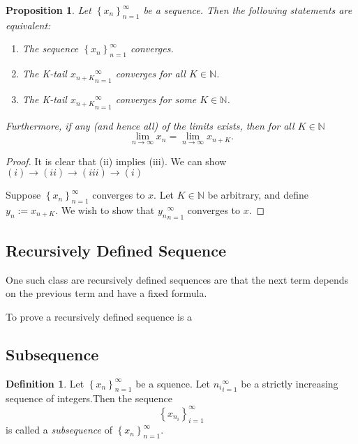 \documentclass{article}
\newtheorem{prop}[theorem]{Proposition}
\theoremstyle{definition}
\newtheorem{defi}{Definition}[section]
\begin{document}
\begin{prop}
Let $\left\{x_{n}\right\}_{n=1}^{\infty}$ be a sequence. Then the following statements are equivalent:
\begin{enumerate}[label=(i)]
    \item The sequence $\left\{x_{n}\right\}_{n=1}^{\infty}$ converges.
    \item The K-tail ${x_{n+K}}_{n=1}^{\infty}$ converges for all $K\in \mathbb{N}$.
    \item The K-tail ${x_{n+K}}_{n=1}^{\infty}$ converges for some $K\in \mathbb{N}$.
\end{enumerate}

Furthermore, if any (and hence all) of the limits exists, then for all $K\in \mathbb{N}$
$$\lim_{n\to \infty}x_{n}=\lim_{n\to \infty}x_{n+K}.$$

\end{prop}

\begin{proof}
It is clear that (ii) implies (iii). We can show $(i)\to (ii)\to (iii)\to (i)$

Suppose $\left\{x_{n}\right\}_{n=1}^{\infty}$ converges to $x$. Let $K\in \mathbb{N}$ be arbitrary, and define $y_{n}:=x_{n+K}$. We wish to show that ${y_{n}}_{n=1}^{\infty}$ converges to $x$.
\end{proof}

\subsection{Recursively Defined Sequence}

One such class are recursively defined sequences are that the next term depends on the previous term and have a fixed formula.

To prove a recursively defined sequence is a 



\subsection{Subsequence}

\begin{defi}
    Let $\left\{x_{n}\right\}_{n=1}^{\infty}$ be a squence. Let ${n_{i}}_{i=1}^{\infty}$ be a strictly increasing sequence of integers.Then the sequence 
    $$\left\{x_{n_{i}}\right\}_{i=1}^{\infty}$$ is called a \textit{subsequence} of $\left\{x_{n}\right\}_{n=1}^{\infty}$.
\end{defi}
\end{document}
